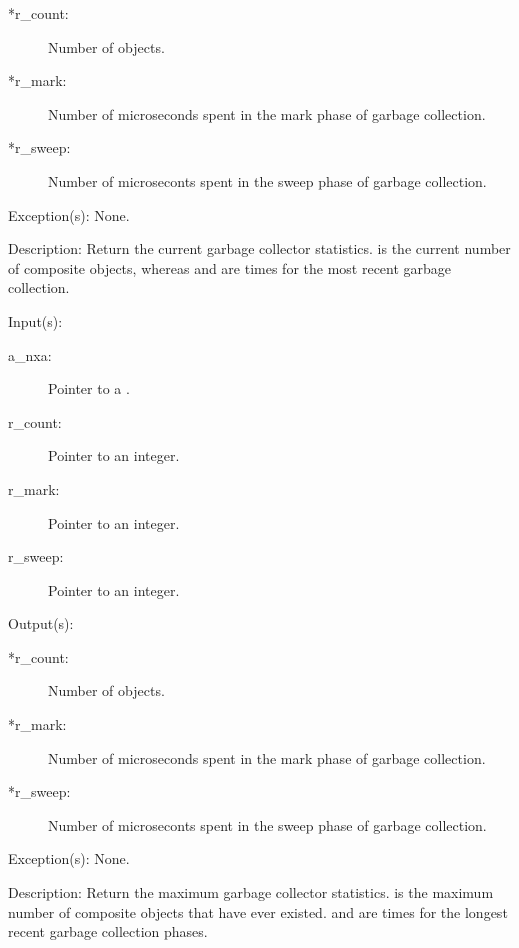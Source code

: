 \begin{capi}
\begin{capilist}
		\begin{description}\item[]
		\item[*r\_count: ]
			Number of objects.
		\item[*r\_mark: ]
			Number of microseconds spent in the mark phase of
			garbage collection.
		\item[*r\_sweep: ]
			Number of microseconts spent in the sweep phase of
			garbage collection.
		\end{description}
	\item[Exception(s): ] None.
	\item[Description: ]
		Return the current garbage collector statistics.
		 is the current number of composite objects,
		whereas  and  are times for the
		most recent garbage collection.
	\end{capilist}
\label{nxa_maximum_get}
	\begin{capilist}
	\item[Input(s): ]
		\begin{description}\item[]
		\item[a\_nxa: ]
			Pointer to a .
		\item[r\_count: ]
			Pointer to an integer.
		\item[r\_mark: ]
			Pointer to an integer.
		\item[r\_sweep: ]
			Pointer to an integer.
		\end{description}
	\item[Output(s): ]
		\begin{description}\item[]
		\item[*r\_count: ]
			Number of objects.
		\item[*r\_mark: ]
			Number of microseconds spent in the mark phase of
			garbage collection.
		\item[*r\_sweep: ]
			Number of microseconts spent in the sweep phase of
			garbage collection.
		\end{description}
	\item[Exception(s): ] None.
	\item[Description: ]
		Return the maximum garbage collector statistics.
		 is the maximum number of composite objects that
		have ever existed.  and  are
		times for the longest recent garbage collection phases.

\end{capilist}
\end{capi}

